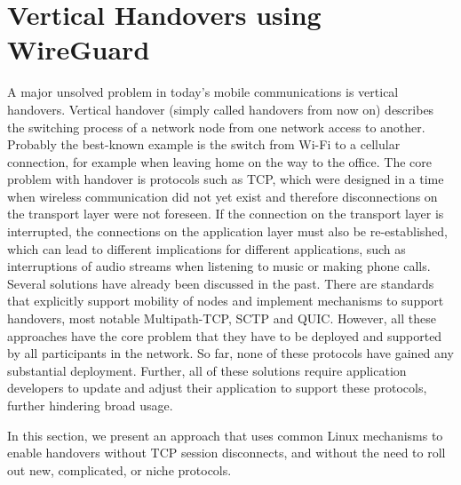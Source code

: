 \newcommand{\ld}{\texttt{LD\_PRELOAD}\xspace}

\section{Vertical Handovers using WireGuard}
\label{sec:wg:impl}

A major unsolved problem in today's mobile communications is vertical handovers.
Vertical handover (simply called handovers from now on) describes the switching process of a network node from one network access to another.
Probably the best-known example is the switch from Wi-Fi to a cellular connection, for example when leaving home on the way to the office.
The core problem with handover is protocols such as TCP, which were designed in a time when wireless communication did not yet exist and therefore disconnections on the transport layer were not foreseen.
If the connection on the transport layer is interrupted, the connections on the application layer must also be re-established, which can lead to different implications for different applications, such as interruptions of audio streams when listening to music or making phone calls.
Several solutions have already been discussed in the past.
There are standards that explicitly support mobility of nodes and implement mechanisms to support handovers, most notable Multipath-TCP, SCTP and QUIC.
However, all these approaches have the core problem that they have to be deployed and supported by all participants in the network.
So far, none of these protocols have gained any substantial deployment.
Further, all of these solutions require application developers to update and adjust their application to support these protocols, further hindering broad usage.

In this section, we present an approach that uses common Linux mechanisms to enable handovers without TCP session disconnects, and without the need to roll out new, complicated, or niche protocols.





